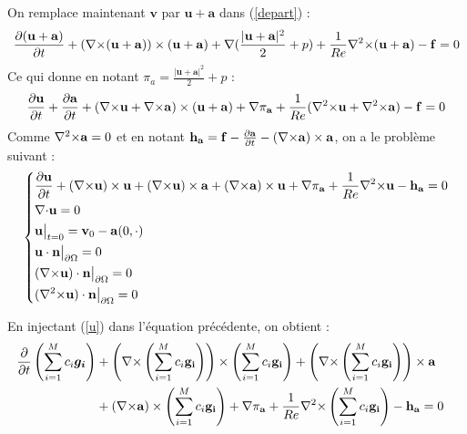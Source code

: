 On remplace maintenant $\mathbf{v}$ par $\mathbf{u}+\mathbf{a}$ dans (\ref{depart}) :
\[ \frac{\partial(\mathbf{u}+\mathbf{a})}{\partial t}+({\nabla\times}(\mathbf{u}+\mathbf{a}))\times(\mathbf{u}+\mathbf{a}) + {\nabla} (\frac{|\mathbf{u}+\mathbf{a}|^2}{2}+p) + \frac{1}{Re}{\nabla^2\times}(\mathbf{u}+\mathbf{a}) - \mathbf{f} = 0 \]
Ce qui donne en notant $\pi_a=\frac{|\mathbf{u}+\mathbf{a}|^2}{2}+p$ :
\[ \frac{\partial \mathbf{u}}{\partial t}+\frac{\partial \mathbf{a}}{\partial t} + ({\nabla\times} \mathbf{u}+{\nabla\times} \mathbf{a})\times(\mathbf{u}+\mathbf{a}) + {\nabla}\pi_{\mathbf{a}} + \frac{1}{Re}({\nabla^2\times} \mathbf{u}+{\nabla^2\times} \mathbf{a}) - \mathbf{f} = 0 \]
Comme ${\nabla^2\times} \mathbf{a} = 0$ et en notant $\mathbf{h_a}=\mathbf{f}-\frac{\partial \mathbf{a}}{\partial t} - ({\nabla\times} \mathbf{a})\times \mathbf{a}$, on a le problème suivant :
\begin{equation}\label{pbu}
\left\{\begin{aligned}
&\frac{\partial \mathbf{u}}{\partial t} + ({\nabla\times} \mathbf{u})\times \mathbf{u} + ({\nabla\times} \mathbf{u})\times \mathbf{a} +({\nabla\times} \mathbf{a})\times \mathbf{u} + {\nabla} \pi_{\mathbf{a}} +\frac{1}{Re}{\nabla^2\times}  \mathbf{u} - \mathbf{h_a} = 0\\
&{\nabla\cdot} \mathbf{u} = 0\\
&\mathbf{u}\big\rvert_{t=0} = \mathbf{v}_0 - \mathbf{a}(0,\cdot)\\
&\mathbf{u}\cdot \mathbf{n}{\big\rvert_{\partial\Omega}} = 0\\
&({\nabla\times} \mathbf{u})\cdot \mathbf{n}{\big\rvert_{\partial\Omega}} = 0\\
&({\nabla^2\times}  \mathbf{u})\cdot \mathbf{n}{\big\rvert_{\partial\Omega}} = 0
\end{aligned}\right.
\end{equation}

En injectant (\ref{u}) dans l'équation précédente, on obtient :
\begin{align*}
\frac{\partial}{\partial t}\left(\sum_{i=1}^M c_i\bm{g_i}\right) &+ \left({\nabla\times} \left(\sum_{i=1}^Mc_i\mathbf{g_i}\right)\right)\times \left(\sum_{i=1}^Mc_i\mathbf{g_i}\right) + \left({\nabla\times} \left(\sum_{i=1}^Mc_i\mathbf{g_i}\right)\right)\times \mathbf{a}&\\
&+ ({\nabla\times} \mathbf{a})\times \left(\sum_{i=1}^Mc_i\mathbf{g_i}\right) + {\nabla} \pi_{\mathbf{a}} +\frac{1}{Re}{\nabla^2\times}  \left(\sum_{i=1}^Mc_i\mathbf{g_i}\right) - \mathbf{h_a} =0\\
\end{align*} 

